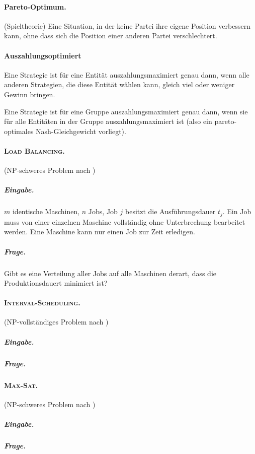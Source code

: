 \documentclass[12pt,twoside]{article}
\theoremstyle{plain}
\theoremstyle{definition}
\theoremstyle{remark}
\newcommand{\ints}{\textsc{Interval-Scheduling}}
\newcommand{\msat}{\textsc{Max-Sat}}
\newcommand{\lb}{\textsc{Load Balancing}}
\begin{document}
\paragraph*{Pareto-Optimum.}
	\label{def:st:pareto}
	(Spieltheorie) Eine Situation, in der keine Partei ihre eigene Position verbessern kann, ohne dass sich die Position einer anderen Partei verschlechtert.
\paragraph*{Auszahlungsoptimiert}
	\label{def:st:auszahlung}
	Eine Strategie ist für eine Entität auszahlungsmaximiert genau dann, wenn alle anderen Strategien, die diese Entität wählen kann, gleich viel oder weniger Gewinn bringen.
	
	Eine Strategie ist für eine Gruppe auszahlungsmaximiert genau dann, wenn sie für alle Entitäten in der Gruppe auszahlungsmaximiert ist (also ein pareto-optimales Nash-Gleichgewicht vorliegt).
\paragraph*{\lb .}
	\label{def:prob:load-balancing}
	(NP-schweres Problem nach \cite{Andreae2016})
		\subparagraph*{Eingabe.}$m$ identische Maschinen, $n$ Jobs, Job $j$ besitzt die Ausführungsdauer $t_j$.
		Ein Job muss von einer einzelnen Maschine vollständig ohne Unterbrechung bearbeitet werden.
		Eine Maschine kann nur einen Job zur Zeit erledigen.
		\subparagraph*{Frage.} Gibt es eine Verteilung aller Jobs auf alle Maschinen derart, dass die Produktionsdauert minimiert ist?
\paragraph*{\ints .}
	\label{def:prob:interval-scheduling}
	(NP-vollständiges Problem nach \cite{Andreae2016})
		\subparagraph*{Eingabe.}
		\subparagraph*{Frage.}
\paragraph*{\msat .}
	\label{def:prob:max-sat}
	(NP-schweres Problem nach \cite{Andreae2016})
		\subparagraph*{Eingabe.}
		\subparagraph*{Frage.}


\nocite{*}
\end{document}
